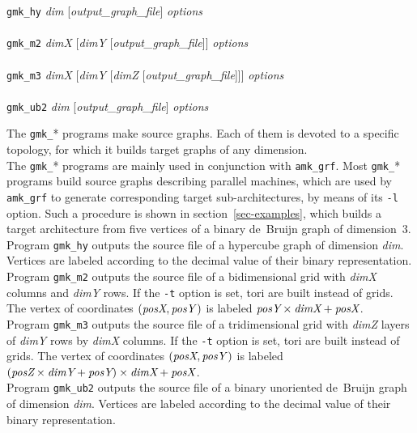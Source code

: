 \begin{itemize}
\progsyn
\texttt{gmk\_hy} {\it dim} [{\it output\_graph\_file}] {\it options}\\
~\\
\texttt{gmk\_m2} {\it dimX} [{\it dimY} [{\it output\_graph\_file}]] {\it options}\\
~\\
\texttt{gmk\_m3} {\it dimX} [{\it dimY} [{\it dimZ} [{\it output\_graph\_file}]]] {\it options}\\
~\\
\texttt{gmk\_ub2} {\it dim} [{\it output\_graph\_file}] {\it options}

\progdes
The \texttt{gmk\_}* programs make source graphs.
Each of them is devoted to a specific topology, for which it builds target
graphs of any dimension.
\\
The \texttt{gmk\_}* programs are mainly used in conjunction with \texttt{amk\_grf}.
Most \texttt{gmk\_}* programs build source graphs
describing parallel machines, which are used by \texttt{amk\_grf} to generate
corresponding target sub-architectures, by means of its \texttt{-l}
option.
Such a procedure is shown in section~\ref{sec-examples}, which builds a target
architecture from five vertices of a binary de~Bruijn graph of dimension~$3$.
\\

\noi
Program \texttt{gmk\_hy} outputs the source file of a hypercube graph of
dimension {\it dim}. Vertices are labeled according to the decimal value
of their binary representation.
\\

\noi
Program \texttt{gmk\_m2} outputs the source file of a bidimensional grid
with {\it dimX\/} columns and {\it dimY\/} rows. If the \texttt{-t}
option is set, tori are built instead of grids. The vertex of
coordinates $(\mbox{\it posX},\mbox{\it posY\/})$ is labeled
$\mbox{\it posY} \times \mbox{\it dimX} + \mbox{\it posX}$.
\\

\noi
Program \texttt{gmk\_m3} outputs the source file of a tridimensional grid
with {\it dimZ} layers of {\it dimY\/} rows by {\it dimX\/}
columns. If the \texttt{-t} option is set, tori are built instead of
grids. The vertex of coordinates $(\mbox{\it posX},\mbox{\it
posY\/})$ is labeled $(\mbox{\it posZ} \times \mbox{\it dimY} +
\mbox{\it posY}) \times \mbox{\it dimX} + \mbox{\it posX}$.
\\

\noi
Program \texttt{gmk\_ub2} outputs the source file of a binary unoriented
de~Bruijn graph of dimension {\it dim}. Vertices are labeled according to
the decimal value of their binary representation.


\end{itemize}
